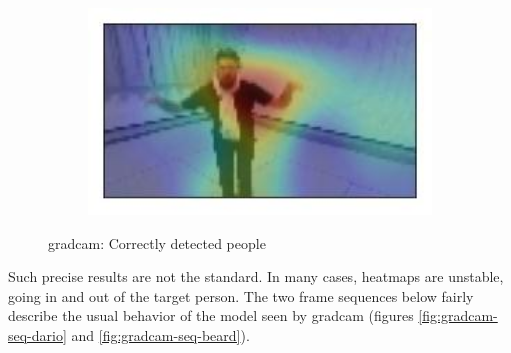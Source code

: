 \begin{figure}[!h]
\begin{center}
\begin{subfigure}[h]{0.24\textwidth}
		\end{subfigure}
		\hfill
		\begin{subfigure}[h]{0.24\textwidth}
			\centering
			\includegraphics[width=1\textwidth]{"contents/images/gradcam/gradcam-ok-4"}
		\end{subfigure}
	\end{center}
	\vspace{-0.5cm}
	\caption[\gls{gradcam}: Correctly detected people]{\gls{gradcam}: Correctly detected people}
	\label{fig:gradcam-ok}
\end{figure}

Such precise results are not the standard. In many cases, heatmaps are unstable, going in and out of the target person. The two frame sequences below fairly describe the usual behavior of the model seen by \gls{gradcam} (figures \ref{fig:gradcam-seq-dario} and \ref{fig:gradcam-seq-beard}).

